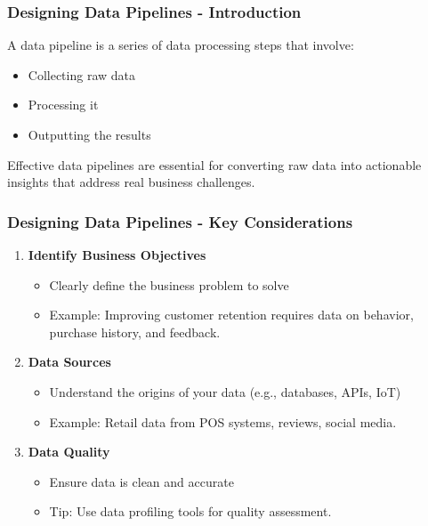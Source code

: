 \documentclass{beamer}
\begin{document}
\begin{frame}[fragile]
    \frametitle{Designing Data Pipelines - Introduction}
    A data pipeline is a series of data processing steps that involve:
    \begin{itemize}
        \item Collecting raw data
        \item Processing it
        \item Outputting the results
    \end{itemize}
    Effective data pipelines are essential for converting raw data into actionable insights that address real business challenges.
\end{frame}

\begin{frame}[fragile]
    \frametitle{Designing Data Pipelines - Key Considerations}
    \begin{enumerate}
        \item \textbf{Identify Business Objectives}
            \begin{itemize}
                \item Clearly define the business problem to solve
                \item Example: Improving customer retention requires data on behavior, purchase history, and feedback.
            \end{itemize}
        \item \textbf{Data Sources}
            \begin{itemize}
                \item Understand the origins of your data (e.g., databases, APIs, IoT)
                \item Example: Retail data from POS systems, reviews, social media.
            \end{itemize}
        \item \textbf{Data Quality}
            \begin{itemize}
                \item Ensure data is clean and accurate
                \item Tip: Use data profiling tools for quality assessment.
            \end{itemize}
    \end{enumerate}
\end{frame}
\end{document}
